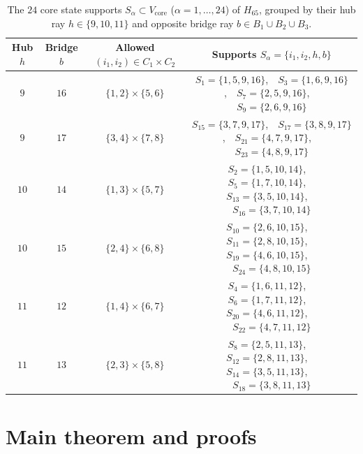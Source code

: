 \documentclass[
  aps,
  pra,
  reprint,
  superscriptaddress,
  amsmath,
  amssymb,
  nofootinbib,
  floatfix
]{revtex4-2}
\theoremstyle{definition}
\theoremstyle{remark}
\begin{document}
\begin{table}[t]
\caption{The $24$ core state supports $S_\alpha\subset V_{\mathrm{core}}$ ($\alpha=1,\ldots,24$) of $H_{65}$, grouped by their hub ray $h\in\{9,10,11\}$ and opposite bridge ray $b\in B_1\cup B_2\cup B_3$.}\label{tab:core-supports}
\begin{ruledtabular}
\begin{tabular}{cccc}
Hub $h$ & Bridge $b$ & Allowed $(i_1,i_2)\in C_1\times C_2$ & Supports $S_\alpha=\{i_1,i_2,h,b\}$ \\ \hline
$9$  & $16$ & $\{1,2\}\times\{5,6\}$ & $S_1=\{1,5,9,16\}$,\ \ $S_3=\{1,6,9,16\}$,\ \ $S_7=\{2,5,9,16\}$,\ \ $S_9=\{2,6,9,16\}$ \\
$9$  & $17$ & $\{3,4\}\times\{7,8\}$ & $S_{15}=\{3,7,9,17\}$,\ \ $S_{17}=\{3,8,9,17\}$,\ \ $S_{21}=\{4,7,9,17\}$,\ \ $S_{23}=\{4,8,9,17\}$ \\ \hline
$10$ & $14$ & $\{1,3\}\times\{5,7\}$ & $S_2=\{1,5,10,14\}$,\ \ $S_5=\{1,7,10,14\}$,\ \ $S_{13}=\{3,5,10,14\}$,\ \ $S_{16}=\{3,7,10,14\}$ \\
$10$ & $15$ & $\{2,4\}\times\{6,8\}$ & $S_{10}=\{2,6,10,15\}$,\ \ $S_{11}=\{2,8,10,15\}$,\ \ $S_{19}=\{4,6,10,15\}$,\ \ $S_{24}=\{4,8,10,15\}$ \\ \hline
$11$ & $12$ & $\{1,4\}\times\{6,7\}$ & $S_4=\{1,6,11,12\}$,\ \ $S_6=\{1,7,11,12\}$,\ \ $S_{20}=\{4,6,11,12\}$,\ \ $S_{22}=\{4,7,11,12\}$ \\
$11$ & $13$ & $\{2,3\}\times\{5,8\}$ & $S_8=\{2,5,11,13\}$,\ \ $S_{12}=\{2,8,11,13\}$,\ \ $S_{14}=\{3,5,11,13\}$,\ \ $S_{18}=\{3,8,11,13\}$
\end{tabular}
\end{ruledtabular}
\end{table}

\section{Main theorem and proofs}
\end{document}
